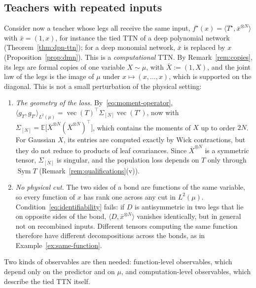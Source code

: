 \documentclass[11pt]{article}
\newcommand{\E}{\mathbb{E}}
\newcommand{\Sym}{\operatorname{Sym}}
\newcommand{\vect}{\operatorname{vec}}
\newcommand{\xb}{\bar{x}}
\theoremstyle{definition}
\numberwithin{equation}{section}
\begin{document}
\subsection{Teachers with repeated inputs}\label{sec:repeated-input}

Consider now a teacher whose legs all receive the same input, $f^\star(x)=\langle T^\star,\xb^{\otimes N}\rangle$ with $\xb=(1,x)$, for instance the tied TTN of a deep polynomial network (Theorem~\ref{thm:dpn-ttn}); for a deep monomial network, $\xb$ is replaced by $x$ (Proposition~\ref{prop:dmn}). This is a \emph{computational} TTN. By Remark~\ref{rem:copies}, its legs are formal copies of one variable $X\sim\mu$, with $\bar X:=(1,X)$, and the joint law of the legs is the image of $\mu$ under $x\mapsto(x,\dots,x)$, which is supported on the diagonal. This is not a small perturbation of the physical setting:
\begin{enumerate}[label=(\roman*),nosep]
\item \emph{The geometry of the loss.} By~\eqref{eq:moment-operator}, $\langle g_T,g_{T'}\rangle_{L^2(\mu)}=\vect(T)^\top\Sigma_{[N]}\vect(T')$, now with $\Sigma_{[N]}=\E\big[\bar X^{\otimes N}(\bar X^{\otimes N})^\top\big]$, which contains the moments of $X$ up to order $2N$. For Gaussian $X$, its entries are computed exactly by Wick contractions, but they do not reduce to products of leaf covariances. Since $\bar X^{\otimes N}$ is a symmetric tensor, $\Sigma_{[N]}$ is singular, and the population loss depends on $T$ only through $\Sym T$ (Remark~\ref{rem:qualifications}(v)).
\item \emph{No physical cut.} The two sides of a bond are functions of the same variable, so every function of $x$ has rank one across any cut in $L^2(\mu)$. Condition~\eqref{eq:identifiability} fails: if $D$ is antisymmetric in two legs that lie on opposite sides of the bond, $\langle D,\xb^{\otimes N}\rangle$ vanishes identically, but in general not on recombined inputs. Different tensors computing the same function therefore have different decompositions across the bonds, as in Example~\ref{ex:same-function}.
\end{enumerate}
Two kinds of observables are then needed: function-level observables, which depend only on the predictor and on $\mu$, and computation-level observables, which describe the tied TTN itself.
\end{document}
